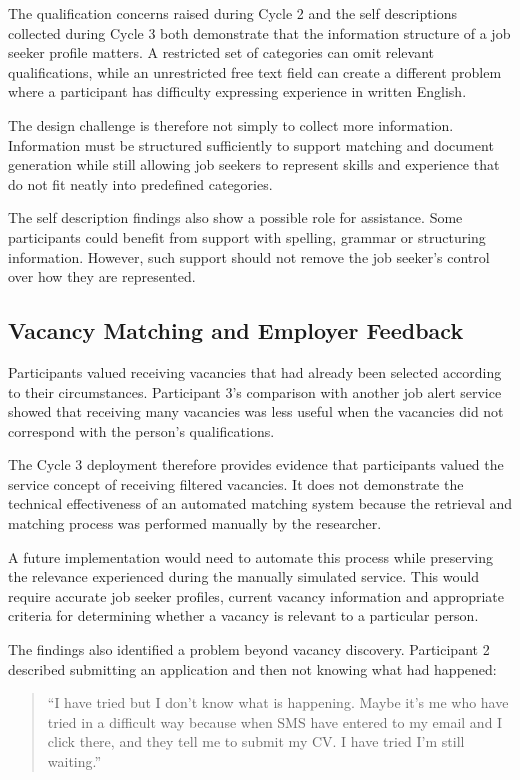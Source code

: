 The qualification concerns raised during Cycle 2 and the self descriptions collected during Cycle 3 both demonstrate that the information structure of a job seeker profile matters. A restricted set of categories can omit relevant qualifications, while an unrestricted free text field can create a different problem where a participant has difficulty expressing experience in written English.

The design challenge is therefore not simply to collect more information. Information must be structured sufficiently to support matching and document generation while still allowing job seekers to represent skills and experience that do not fit neatly into predefined categories.

The self description findings also show a possible role for assistance. Some participants could benefit from support with spelling, grammar or structuring information. However, such support should not remove the job seeker's control over how they are represented.


\subsection{Vacancy Matching and Employer Feedback}

Participants valued receiving vacancies that had already been selected according to their circumstances. Participant 3's comparison with another job alert service showed that receiving many vacancies was less useful when the vacancies did not correspond with the person's qualifications.

The Cycle 3 deployment therefore provides evidence that participants valued the service concept of receiving filtered vacancies. It does not demonstrate the technical effectiveness of an automated matching system because the retrieval and matching process was performed manually by the researcher.

A future implementation would need to automate this process while preserving the relevance experienced during the manually simulated service. This would require accurate job seeker profiles, current vacancy information and appropriate criteria for determining whether a vacancy is relevant to a particular person.

The findings also identified a problem beyond vacancy discovery. Participant 2 described submitting an application and then not knowing what had happened:

\begin{quote}
``I have tried but I don't know what is happening. Maybe it's me who have tried in a difficult way because when SMS have entered to my email and I click there, and they tell me to submit my CV. I have tried I'm still waiting.''
\end{quote}

